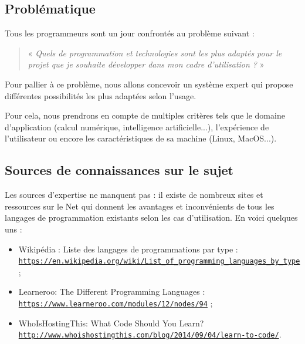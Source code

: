 \documentclass[a4paper,12pt]{article}
\begin{document}
\subsection{Problématique}

Tous les programmeurs sont un jour confrontés au problème suivant :

\begin{quotation}
\centering
« \textit{Quels de programmation et technologies sont les plus adaptés pour le projet que je souhaite développer dans mon cadre d'utilisation ?} »
    
\end{quotation}


    Pour pallier à ce problème, nous allons concevoir un système expert qui propose différentes possibilités les plus adaptées selon l'usage.
    
    Pour cela, nous prendrons en compte de multiples critères tels que le domaine d'application (calcul numérique, intelligence artificielle...), l'expérience de l'utilisateur ou encore les caractéristiques de sa machine (Linux, MacOS...).
    
\subsection{Sources de connaissances sur le sujet}

    Les sources d'expertise ne manquent pas : il existe de nombreux sites et ressources sur le Net qui donnent les avantages et inconvénients de tous les langages de programmation existants selon les cas d'utilisation. En voici quelques uns :
    \begin{itemize}
        \item Wikipédia : Liste des langages de programmations par type :\\ \href{https://en.wikipedia.org/wiki/List_of_programming_languages_by_type}{\texttt{https://en.wikipedia.org/wiki/List\_of\_programming\_languages\_by\_type}} ;
        \item Learneroo: The Different Programming Languages :\\ \href{https://www.learneroo.com/modules/12/nodes/94}{\texttt{https://www.learneroo.com/modules/12/nodes/94}} ;
        \item WhoIsHostingThis: What Code Should You Learn?\\ \href{http://www.whoishostingthis.com/blog/2014/09/04/learn-to-code/}{\texttt{http://www.whoishostingthis.com/blog/2014/09/04/learn-to-code/}}.
    \end{itemize}
\end{document}
